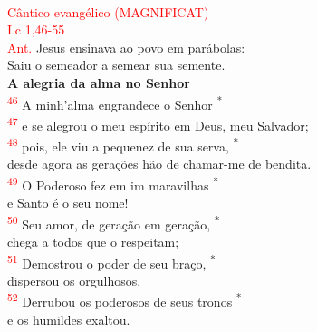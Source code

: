 \documentclass{book}
\begin{document}
\begin{center}
    \vspace{.2cm} \\
    \textcolor{red}{Cântico evangélico (MAGNIFICAT) \\ Lc 1,46-55}
    \vspace{.2cm} \\
    \textcolor{red}{Ant.} Jesus ensinava ao povo em parábolas: \\
    Saiu o semeador a semear sua semente.
    \vspace{.2cm} \\
    \textbf{A alegria da alma no Senhor}
    \vspace{.2cm} \\
    \textsuperscript{\underline{\hspace{.07in}}\textcolor{red}{46}} A minh'alma engrandece o Senhor \textsuperscript{*} \\
    \textsuperscript{\textcolor{red}{47}} e se alegrou o meu espírito em Deus, meu Salvador; \\
    \textsuperscript{\underline{\hspace{.07in}}\textcolor{red}{48}} pois, ele viu a pequenez de sua serva, \textsuperscript{*}\\
    desde agora as gerações hão de chamar-me de bendita.
    \vspace{.2cm} \\
    \textsuperscript{\underline{\hspace{.07in}}\textcolor{red}{49}} O Poderoso fez em im maravilhas \textsuperscript{*} \\
    e Santo é o seu nome! \\
    \textsuperscript{\underline{\hspace{.07in}}\textcolor{red}{50}} Seu amor, de geração em geração, \textsuperscript{*} \\
    chega a todos que o respeitam;
    \vspace{.2cm} \\
    \textsuperscript{\underline{\hspace{.07in}}\textcolor{red}{51}} Demostrou o poder de seu braço, \textsuperscript{*} \\
    dispersou os orgulhosos. \\
    \textsuperscript{\underline{\hspace{.07in}}\textcolor{red}{52}} Derrubou os poderosos de seus tronos \textsuperscript{*} \\
    e os humildes exaltou.
    \vspace{.2cm} \\

\end{center}
\end{document}
